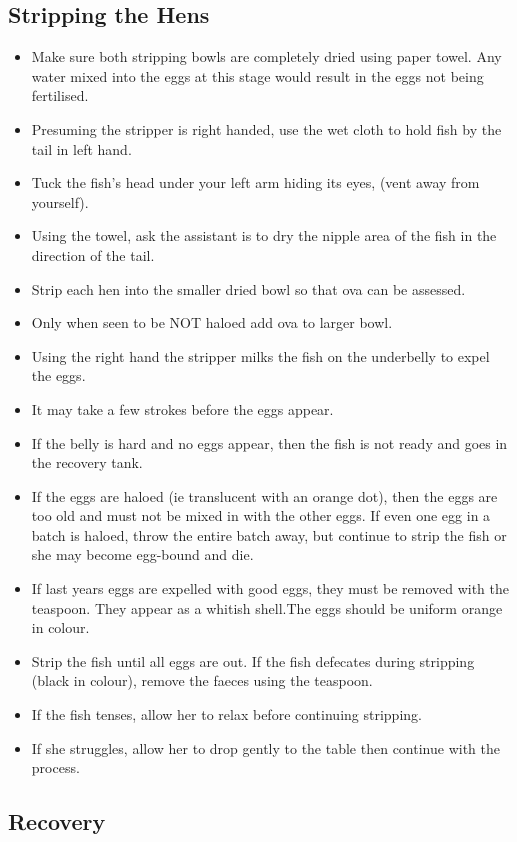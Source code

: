 \subsection{Stripping the Hens}   

\begin{itemize}
\item Make sure both stripping bowls are completely dried using paper towel. 
Any water mixed into the eggs at this stage would result in the eggs not being fertilised.
\item Presuming the stripper is right handed, use the wet cloth to hold fish by the tail in left hand. 
\item Tuck the fish's head under your left arm hiding its eyes, (vent away from yourself).
\item Using the towel,  ask the assistant is to dry the nipple area of the fish in the direction of the tail. 
\item Strip each hen into the smaller dried bowl so that ova can be assessed.
\item Only when seen to be NOT haloed add ova to larger bowl.
\item Using the right hand the stripper milks the fish on the underbelly to expel the eggs. 
\item It may take a few strokes before the eggs appear.
\item If the belly is hard and no eggs appear, then the fish is not ready and goes in the recovery tank. 
\item If the eggs are haloed (ie translucent with an orange dot), then the eggs are too old and must not be mixed in with the other eggs. If even one egg in a batch is haloed, throw the entire batch away, but continue to strip the fish or she may become egg-bound and die. 
\item If last years eggs are expelled with good eggs, they must be removed with the teaspoon. They appear as a whitish shell.The eggs should be uniform orange in colour. 
\item Strip the fish until all eggs are out.  If the fish defecates during stripping (black  in colour), remove the faeces using the teaspoon. 
\item If the fish tenses, allow her to relax before continuing stripping. 
\item If she struggles, allow her to drop gently to the table then continue with the process.  
\end{itemize}
 
\subsection{Recovery}

